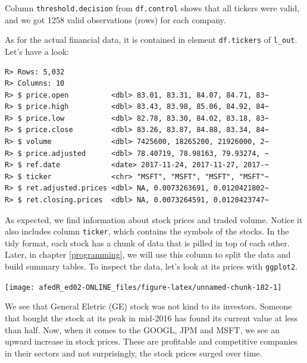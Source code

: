 \documentclass[
  12pt,
]{book}
\newenvironment{Shaded}{\begin{snugshade}}{\end{snugshade}}
\newcommand{\CommentTok}[1]{\textcolor[rgb]{0.37,0.37,0.37}{\textit{#1}}}
\newcommand{\FunctionTok}[1]{\textcolor[rgb]{0,0,0}{#1}}
\newcommand{\NormalTok}[1]{#1}
\newcommand{\SpecialCharTok}[1]{\textcolor[rgb]{0,0,0}{#1}}
\begin{document}
Column \texttt{threshold.decision} from \texttt{df.control} shows that all tickers were valid, and we got 1258 valid observations (rows) for each company.

As for the actual financial data, it is contained in element \texttt{df.tickers} of \texttt{l\_out}. Let's have a look:

\begin{Shaded}
\end{Shaded}

\begin{verbatim}
R> Rows: 5,032
R> Columns: 10
R> $ price.open          <dbl> 83.01, 83.31, 84.07, 84.71, 83~
R> $ price.high          <dbl> 83.43, 83.98, 85.06, 84.92, 84~
R> $ price.low           <dbl> 82.78, 83.30, 84.02, 83.18, 83~
R> $ price.close         <dbl> 83.26, 83.87, 84.88, 83.34, 84~
R> $ volume              <dbl> 7425600, 18265200, 21926000, 2~
R> $ price.adjusted      <dbl> 78.40719, 78.98163, 79.93274, ~
R> $ ref.date            <date> 2017-11-24, 2017-11-27, 2017-~
R> $ ticker              <chr> "MSFT", "MSFT", "MSFT", "MSFT"~
R> $ ret.adjusted.prices <dbl> NA, 0.0073263691, 0.0120421802~
R> $ ret.closing.prices  <dbl> NA, 0.0073264591, 0.0120423747~
\end{verbatim}

As expected, we find information about stock prices and traded volume. Notice it also includes column \texttt{ticker}, which contains the symbols of the stocks. In the tidy format, each stock has a chunk of data that is pilled in top of each other. Later, in chapter \ref{programming}, we will use this column to split the data and build summary tables. To inspect the data, let's look at its prices with \texttt{ggplot2}.

\begin{center}\texttt{[image: afedR\_ed02-ONLINE\_files/figure-latex/unnamed-chunk-182-1]} \end{center}

We see that General Eletric (GE) stock was not kind to its investors. Someone that bought the stock at its peak in mid-2016 has found its current value at less than half. Now, when it comes to the GOOGL, JPM and MSFT, we see an upward increase in stock prices. These are profitable and competitive companies in their sectors and not surprisingly, the stock prices surged over time.
\end{document}
